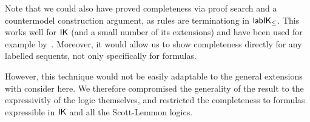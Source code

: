 

Note that we could also have proved completeness via proof search and a countermodel construction argument, as rules are terminationg in $\mathsf{lab}\mathsf{IK}_{\le}$. 
%
This works well for $\mathsf{IK}$ (and a small number of its extensions) and have been used for example by~\cite{maffezioli:etal:synthese13}. 
%
Moreover, it would allow us to show completeness directly for any labelled sequents, not only specifically for formulas. 

However, this technique would not be easily adaptable to the general extensions with consider here. 
%
We therefore compromised the generality of the result to the expressivitly of the logic themselves, and restricted the completeness to formulas expressible in $\mathsf{IK}$ and all the Scott-Lemmon logics.



